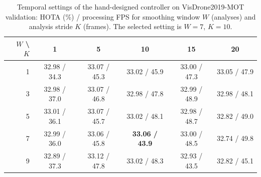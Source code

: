 \begin{table}[t]
\centering
\caption{Temporal settings of the hand-designed controller on VisDrone2019-MOT validation: HOTA (\%) / processing FPS for smoothing window $W$ (analyses) and analysis stride $K$ (frames). The selected setting is $W=7$, $K=10$.}
\label{tab:temporal}
\small
\begin{tabular}{rccccc}
\hline
$W$ \textbackslash{} $K$ & 1 & 5 & 10 & 15 & 20 \\
\hline
1 & 32.98 / 34.3 & 33.07 / 45.3 & 33.02 / 45.9 & 33.00 / 47.3 & 33.05 / 47.9 \\
3 & 32.98 / 37.0 & 33.07 / 46.8 & 32.98 / 47.8 & 32.99 / 48.9 & 32.98 / 48.1 \\
5 & 33.01 / 36.1 & 33.07 / 45.7 & 33.02 / 48.1 & 32.98 / 48.7 & 32.82 / 49.0 \\
7 & 32.99 / 36.0 & 33.06 / 45.8 & \textbf{33.06 / 43.9} & 33.00 / 48.5 & 32.74 / 49.8 \\
9 & 32.89 / 37.3 & 33.12 / 47.8 & 33.02 / 48.3 & 32.93 / 43.5 & 32.82 / 45.1 \\
\hline
\end{tabular}
\end{table}

